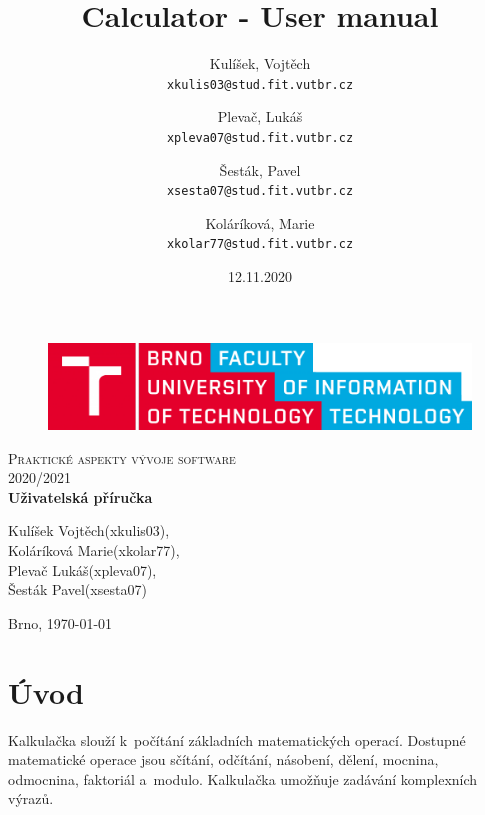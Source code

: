 \documentclass[12pt,czech]{article}
\author{
  Kulíšek, Vojtěch\\
  \texttt{xkulis03@stud.fit.vutbr.cz}
  \and
  Plevač, Lukáš\\
  \texttt{xpleva07@stud.fit.vutbr.cz}
  \and
  Šesták, Pavel\\
  \texttt{xsesta07@stud.fit.vutbr.cz}
  \and
  Koláríková, Marie\\
  \texttt{xkolar77@stud.fit.vutbr.cz}
}
\title{Calculator - User manual}
\date{12.11.2020}
\begin{document}
  \begin{titlepage}
		\begin{center}

			\begin{figure}
				\center\includegraphics[scale=0.3]{images/logo.png}
			\end{figure}

			\vspace{3cm}

			\textsc{\LARGE 	Praktické aspekty vývoje software	} \\[0.5cm]
			\textsc{\LARGE 2020/2021} \\[3.5cm]

			\textbf{\LARGE Uživatelská příručka} \\
			\vspace{3cm}
		    \vspace{3cm}
		    
		    \Large{Kulíšek Vojtěch(xkulis03),\\
		    Koláríková Marie(xkolar77),\\
		    Plevač Lukáš(xpleva07),\\
		    Šesták Pavel(xsesta07)} \\[0.5cm]
		    
			
			\vspace{3cm}
                
		    \textsc{}{\LARGE Brno, \today}

		\end{center}
	\end{titlepage}

\begin{center}
	\tableofcontents %
	\newpage %
\end{center}
  

\section{Úvod}
Kalkulačka slouží k~počítání základních matematických operací. 
Dostupné matematické operace jsou sčítání, odčítání, násobení, dělení, mocnina, odmocnina, faktoriál a~modulo. Kalkulačka umožňuje zadávání komplexních výrazů.
\end{document}
